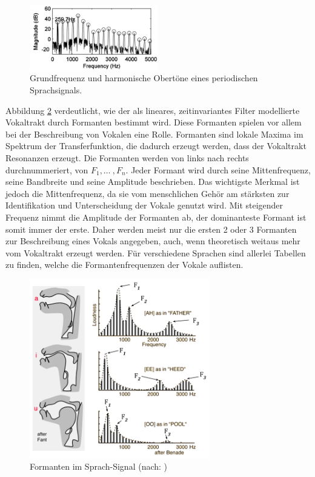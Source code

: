 \begin{figure}[h]
	\centering
	\includegraphics[width=0.5\textwidth]{bilder/pitchPeaks.png}
	\caption{Grundfrequenz und harmonische Obertöne eines periodischen Sprachsignals.}
	\label{img:pitchPeaks}
\end{figure}	

Abbildung \ref{img:formants} verdeutlicht, wie der als lineares, zeitinvariantes Filter modellierte Vokaltrakt durch Formanten bestimmt wird. Diese Formanten spielen vor allem bei der Beschreibung von Vokalen eine Rolle. Formanten sind lokale Maxima im Spektrum der Transferfunktion, die dadurch erzeugt werden, dass der Vokaltrakt Resonanzen erzeugt. Die Formanten werden von links nach rechts durchnummeriert, von $F_1 , \ldots\ , F_n$. Jeder Formant wird durch seine Mittenfrequenz, seine Bandbreite und seine Amplitude beschrieben. Das wichtigste Merkmal ist jedoch die Mittenfrequenz, da sie vom menschlichen Gehör am stärksten zur Identifikation und Unterscheidung der Vokale genutzt wird. Mit steigender Frequenz nimmt die Amplitude der Formanten ab, der dominanteste Formant ist somit immer der erste. Daher werden meist nur die ersten 2 oder 3 Formanten zur Beschreibung eines Vokals angegeben, auch, wenn theoretisch weitaus mehr vom Vokaltrakt erzeugt werden. Für verschiedene Sprachen sind allerlei Tabellen zu finden, welche die Formantenfrequenzen der Vokale auflisten.\cite[S. 19]{sprachverarbeitung}

\begin{figure}[H]
	\centering
	\includegraphics[width=0.7\textwidth]{bilder/formants02.png}
	\caption{Formanten im Sprach-Signal (nach: \cite{benade})}
	\label{img:formants}
\end{figure}	

